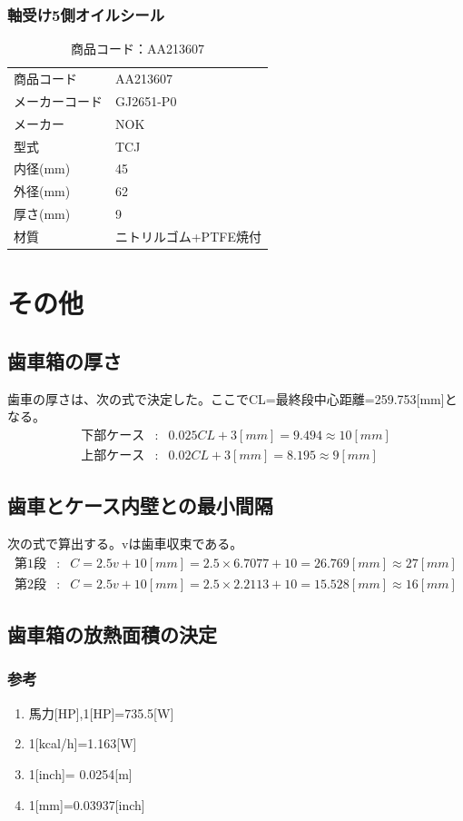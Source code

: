 \documentclass[a4j,twoside,openright,11pt]{jreport}
\begin{document}
\subsection{軸受け5側オイルシール}
\begin{table}[htb]
\begin{center}
  \caption{商品コード：AA213607}
  \begin{tabular}{ll}
    \hline
    商品コード&AA213607\\
    メーカーコード&GJ2651-P0\\
    メーカー&NOK\\
    型式&TCJ\\
    内径(mm)&45
    \\外径(mm)&62
    \\厚さ(mm)&9\\
    材質&ニトリルゴム+PTFE焼付\\
    \hline
  \end{tabular}
\end{center}
\end{table}

\chapter{その他}
\section{歯車箱の厚さ}
歯車の厚さは、次の式で決定した。ここでCL=最終段中心距離=259.753[mm]となる。
\begin{eqnarray}
下部ケース&:&0.025CL + 3[mm] = 9.494 \approx 10[mm]\\
上部ケース&:&0.02CL + 3[mm] = 8.195 \approx 9[mm]
\end{eqnarray}
\section{歯車とケース内壁との最小間隔}
次の式で算出する。vは歯車収束である。
\begin{eqnarray}
第1段&:&C=2.5v+10[mm] =2.5 \times 6.7077 + 10 = 26.769[mm]  \approx 27[mm]\\
第2段&:&C=2.5v+10[mm] =2.5 \times 2.2113 + 10 = 15.528[mm] \approx 16[mm]
\end{eqnarray}
\section{歯車箱の放熱面積の決定}
\subsection{参考}
\begin{enumerate}
\item 馬力[HP],1[HP]=735.5[W]
\item 1[kcal/h]=1.163[W]
\item 1[inch]= 0.0254[m]
\item 1[mm]=0.03937[inch]
\end{enumerate}
\end{document}
